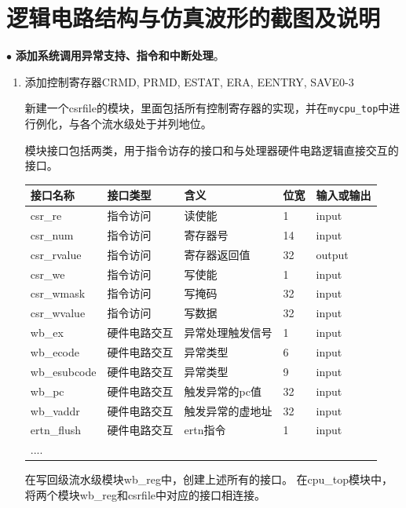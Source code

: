 \documentclass[11pt]{article}
\begin{document}


\section{逻辑电路结构与仿真波形的截图及说明}
\noindent
$\bullet$
\textbf{添加系统调用异常支持、指令和中断处理}。
\begin{enumerate}
  \item 添加控制寄存器CRMD, PRMD, ESTAT, ERA, EENTRY, SAVE0-3
  
  新建一个csrfile的模块，里面包括所有控制寄存器的实现，并在\verb|mycpu_top|中进行例化，与各个流水级处于并列地位。

  模块接口包括两类，用于指令访存的接口和与处理器硬件电路逻辑直接交互的接口。

  \begin{table}[!ht]
    \centering
    \begin{tabular}{|l|l|l|l|l|}
    \hline
        接口名称 & 接口类型 & 含义 & 位宽 & 输入或输出 \\ \hline
        csr\_re & 指令访问 & 读使能 & 1 & input \\ \hline
        csr\_num & 指令访问 & 寄存器号 & 14 & input \\ \hline
        csr\_rvalue & 指令访问 & 寄存器返回值 & 32 & output \\ \hline
        csr\_we & 指令访问 & 写使能 & 1 & input \\ \hline
        csr\_wmask & 指令访问 & 写掩码 & 32 & input \\ \hline
        csr\_wvalue & 指令访问 & 写数据 & 32 & input \\ \hline
        wb\_ex & 硬件电路交互 & 异常处理触发信号 & 1 & input \\ \hline
        wb\_ecode & 硬件电路交互 & 异常类型 & 6 & input \\ \hline
        wb\_esubcode & 硬件电路交互 & 异常类型 & 9 & input \\ \hline
        wb\_pc & 硬件电路交互 & 触发异常的pc值 & 32 & input \\ \hline
        wb\_vaddr & 硬件电路交互 & 触发异常的虚地址 & 32 & input \\ \hline
        ertn\_flush & 硬件电路交互 & ertn指令 & 1 & input \\ \hline
        .... & ~ & ~ & ~ & ~ \\ \hline
    \end{tabular}
\end{table}
在写回级流水级模块wb\_reg中，创建上述所有的接口。
在cpu\_top模块中，将两个模块wb\_reg和csrfile中对应的接口相连接。


\end{enumerate}
\end{document}
